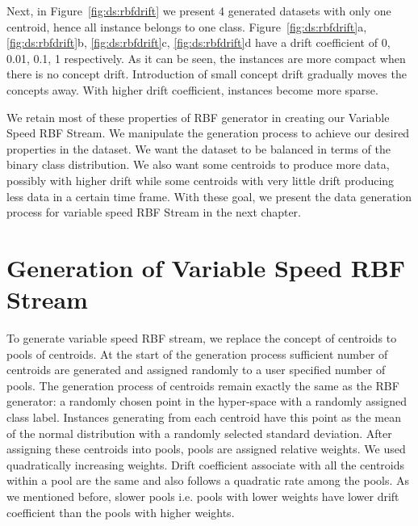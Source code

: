 \documentclass[a4paper, 11pt, oneside]{book}
\begin{document}
Next, in Figure~\ref{fig:ds:rbfdrift} we present 4 generated datasets with only one centroid, hence all instance belongs to one class. Figure~\ref{fig:ds:rbfdrift}a, \ref{fig:ds:rbfdrift}b, \ref{fig:ds:rbfdrift}c, \ref{fig:ds:rbfdrift}d have a drift coefficient of 0, 0.01, 0.1, 1 respectively. As it can be seen, the instances are more compact when there is no concept drift. Introduction of small concept drift gradually moves the concepts away. With higher drift coefficient, instances become more sparse.

We retain most of these properties of RBF generator in creating our Variable Speed RBF Stream. We manipulate the generation process to achieve our desired properties in the dataset. We want the dataset to be balanced in terms of the binary class distribution. We also want some centroids to produce more data, possibly with higher drift while some centroids with very little drift producing less data in a certain time frame. With these goal, we present the data generation process for variable speed RBF Stream in the next chapter.

\section{Generation of Variable Speed RBF Stream}
To generate variable speed RBF stream, we replace the concept of centroids to pools of centroids. At the start of the generation process sufficient number of centroids are generated and assigned randomly to a user specified number of pools. The generation process of centroids remain exactly the same as the RBF generator: a randomly chosen point in the hyper-space with a randomly assigned class label. Instances generating from each centroid have this point as the mean of the normal distribution with a randomly selected standard deviation. After assigning these centroids into pools, pools are assigned relative weights. We used quadratically increasing weights. Drift coefficient associate with all the centroids within a pool are the same and also follows a quadratic rate among the pools. As we mentioned before, slower pools i.e. pools with lower weights have lower drift coefficient than the pools with higher weights.
\end{document}
